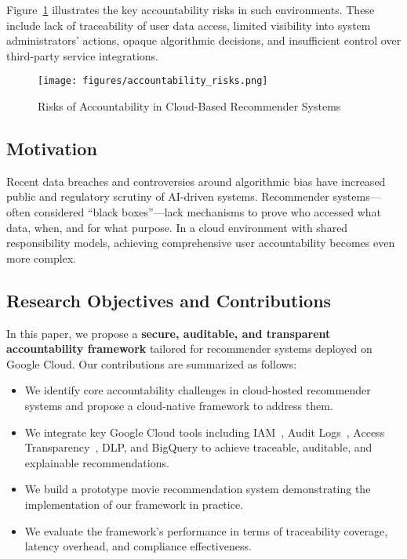 \documentclass[acmsmall]{acmart}
\begin{document}
Figure~\ref{fig:accountability_risks} illustrates the key accountability risks in such environments. These include lack of traceability of user data access, limited visibility into system administrators' actions, opaque algorithmic decisions, and insufficient control over third-party service integrations.

\begin{figure}[h]
    \centering
    \texttt{[image: figures/accountability\_risks.png]}
    \caption{Risks of Accountability in Cloud-Based Recommender Systems}
    \label{fig:accountability_risks}
\end{figure}

\subsection{Motivation}

Recent data breaches and controversies around algorithmic bias have increased public and regulatory scrutiny of AI-driven systems. Recommender systems—often considered ``black boxes''—lack mechanisms to prove who accessed what data, when, and for what purpose. In a cloud environment with shared responsibility models, achieving comprehensive user accountability becomes even more complex.

\subsection{Research Objectives and Contributions}

In this paper, we propose a \textbf{secure, auditable, and transparent accountability framework} tailored for recommender systems deployed on Google Cloud. Our contributions are summarized as follows:

\begin{itemize}
    \item We identify core accountability challenges in cloud-hosted recommender systems and propose a cloud-native framework to address them.
    \item We integrate key Google Cloud tools including IAM~\cite{gcp_iam}, Audit Logs~\cite{gcp_auditlogs}, Access Transparency~\cite{gcp_transparency}, DLP, and BigQuery to achieve traceable, auditable, and explainable recommendations.
    \item We build a prototype movie recommendation system demonstrating the implementation of our framework in practice.
    \item We evaluate the framework’s performance in terms of traceability coverage, latency overhead, and compliance effectiveness.
\end{itemize}
\end{document}
